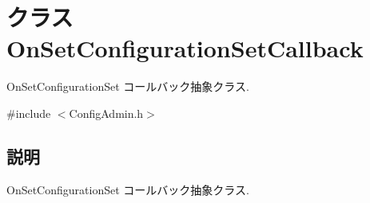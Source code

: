 \section{クラス OnSetConfigurationSetCallback}
\label{classOnSetConfigurationSetCallback}


OnSetConfigurationSet コールバック抽象クラス.  




{\ttfamily \#include $<$ConfigAdmin.h$>$}



\subsection{説明}
OnSetConfigurationSet コールバック抽象クラス. 